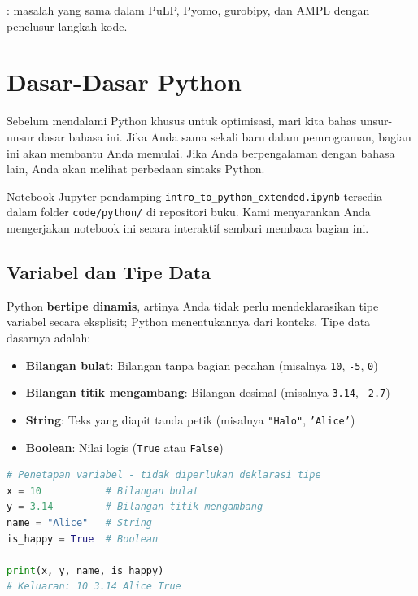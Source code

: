 \begin{tryit}
: masalah yang sama dalam PuLP, Pyomo, gurobipy, dan AMPL dengan penelusur langkah kode.
\end{tryit}


\section{Dasar-Dasar Python}

Sebelum mendalami Python khusus untuk optimisasi, mari kita bahas unsur-unsur dasar bahasa ini. Jika Anda sama sekali baru dalam pemrograman, bagian ini akan membantu Anda memulai. Jika Anda berpengalaman dengan bahasa lain, Anda akan melihat perbedaan sintaks Python.

\begin{resource}
Notebook Jupyter pendamping \texttt{intro\_to\_python\_extended.ipynb} tersedia dalam folder \texttt{code/python/} di repositori buku. Kami menyarankan Anda mengerjakan notebook ini secara interaktif sembari membaca bagian ini.
\end{resource}

\subsection{Variabel dan Tipe Data}

Python \textbf{bertipe dinamis}, artinya Anda tidak perlu mendeklarasikan tipe variabel secara eksplisit; Python menentukannya dari konteks. Tipe data dasarnya adalah:

\begin{itemize}
\item \textbf{Bilangan bulat}: Bilangan tanpa bagian pecahan (misalnya \texttt{10}, \texttt{-5}, \texttt{0})
\item \textbf{Bilangan titik mengambang}: Bilangan desimal (misalnya \texttt{3.14}, \texttt{-2.7})
\item \textbf{String}: Teks yang diapit tanda petik (misalnya \texttt{"Halo"}, \texttt{'Alice'})
\item \textbf{Boolean}: Nilai logis (\texttt{True} atau \texttt{False})
\end{itemize}

\begin{lstlisting}[language=Python]
# Penetapan variabel - tidak diperlukan deklarasi tipe
x = 10           # Bilangan bulat
y = 3.14         # Bilangan titik mengambang
name = "Alice"   # String
is_happy = True  # Boolean

print(x, y, name, is_happy)
# Keluaran: 10 3.14 Alice True
\end{lstlisting}

